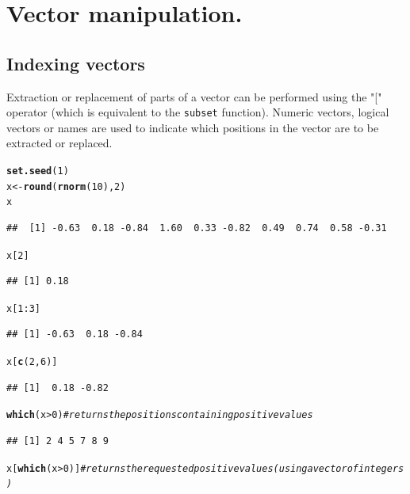 \documentclass[10pt]{article}\usepackage[]{graphicx}\usepackage[]{color}
\makeatletter
\newcommand{\hlnum}[1]{\textcolor[rgb]{0.686,0.059,0.569}{#1}}%
\newcommand{\hlcom}[1]{\textcolor[rgb]{0.678,0.584,0.686}{\textit{#1}}}%
\newcommand{\hlopt}[1]{\textcolor[rgb]{0,0,0}{#1}}%
\newcommand{\hlstd}[1]{\textcolor[rgb]{0.345,0.345,0.345}{#1}}%
\newcommand{\hlkwb}[1]{\textcolor[rgb]{0.69,0.353,0.396}{#1}}%
\newcommand{\hlkwd}[1]{\textcolor[rgb]{0.737,0.353,0.396}{\textbf{#1}}}%
\newenvironment{kframe}{%
 \def\at@end@of@kframe{}%
 \ifinner\ifhmode%
  \def\at@end@of@kframe{\end{minipage}}%
  \begin{minipage}{\columnwidth}%
 \fi\fi%
 \def\FrameCommand##1{\hskip\@totalleftmargin \hskip-\fboxsep
 \colorbox{shadecolor}{##1}\hskip-\fboxsep
     \hskip-\linewidth \hskip-\@totalleftmargin \hskip\columnwidth}%
 \MakeFramed {\advance\hsize-\width
   \@totalleftmargin\z@ \linewidth\hsize
   \@setminipage}}%
 {\par\unskip\endMakeFramed%
 \at@end@of@kframe}
\newenvironment{knitrout}{}{} %
\newcommand{\Rfunction}[1]{{\texttt{#1}}}
\makeatother
\begin{document}
\section{Vector manipulation.}
\subsection{Indexing vectors}
Extraction or replacement of parts of a vector can be performed using the "[" operator (which is equivalent to the \Rfunction{subset} function). Numeric vectors, logical vectors or names are used to indicate which positions in the vector are to be extracted or replaced.

\begin{knitrout}
\color{fgcolor}\begin{kframe}
\begin{alltt}
\hlkwd{set.seed}\hlstd{(}\hlnum{1}\hlstd{)}
\hlstd{x} \hlkwb{<-} \hlkwd{round}\hlstd{(}\hlkwd{rnorm}\hlstd{(}\hlnum{10}\hlstd{),}\hlnum{2}\hlstd{)}
\hlstd{x}
\end{alltt}
\begin{verbatim}
##  [1] -0.63  0.18 -0.84  1.60  0.33 -0.82  0.49  0.74  0.58 -0.31
\end{verbatim}
\begin{alltt}
\hlstd{x[}\hlnum{2}\hlstd{]}
\end{alltt}
\begin{verbatim}
## [1] 0.18
\end{verbatim}
\begin{alltt}
\hlstd{x[}\hlnum{1}\hlopt{:}\hlnum{3}\hlstd{]}
\end{alltt}
\begin{verbatim}
## [1] -0.63  0.18 -0.84
\end{verbatim}
\begin{alltt}
\hlstd{x[}\hlkwd{c}\hlstd{(}\hlnum{2}\hlstd{,}\hlnum{6}\hlstd{)]}
\end{alltt}
\begin{verbatim}
## [1]  0.18 -0.82
\end{verbatim}
\begin{alltt}
\hlkwd{which}\hlstd{(x}\hlopt{>}\hlnum{0}\hlstd{)}       \hlcom{# returns the positions containing positive values}
\end{alltt}
\begin{verbatim}
## [1] 2 4 5 7 8 9
\end{verbatim}
\begin{alltt}
\hlstd{x[}\hlkwd{which}\hlstd{(x}\hlopt{>}\hlnum{0}\hlstd{)]}    \hlcom{# returns the requested positive values (using a vector of integers)}

\end{alltt}
\end{kframe}
\end{knitrout}
\end{document}
